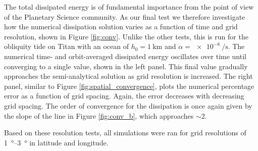 The total dissipated energy is of fundamental importance from the point of view of the Planetary Science community. As our final test we therefore investigate how the numerical dissipation solution varies as a function of time and grid resolution, shown in Figure \ref{fig:conv}. Unlike the other tests, this is run for the obliquity tide on Titan with an ocean of $h_0 = \SI{1}{\kilo\metre}$ and $\alpha = \SI{e-8}{\per\second}$. The numerical time- and orbit-averaged dissipated energy oscillates over time until converging to a single value, shown in the left panel. This final value gradually approaches the \citet{matsuyama2014tidal} semi-analytical solution as grid resolution is increased. The right panel, similar to Figure \ref{fig:spatial_convergence}, plots the numerical percentage error as a function of grid spacing. Again, the error decreases with decreasing grid spacing. The order of convergence for the dissipation is once again given by the slope of the line in Figure \ref{fig:conv_b}, which approaches $\sim 2$.

Based on these resolution tests, all simulations were ran for grid resolutions of \SIrange{1}{3}{\degree} in latitude and longitude.